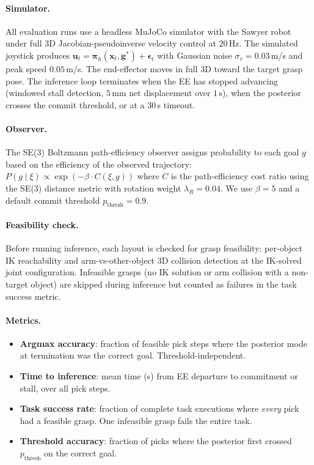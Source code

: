 \documentclass[letterpaper, 10pt, conference]{ieeeconf}
\begin{document}
\paragraph{Simulator.}
All evaluation runs use a headless MuJoCo simulator with the Sawyer
robot under full 3D Jacobian-pseudoinverse velocity control at
$20$\,Hz.  The simulated joystick produces $\mathbf{u}_t =
\boldsymbol{\pi}_h(\mathbf{x}_t, \mathbf{g}^*) +
\boldsymbol{\epsilon}_t$ with Gaussian noise $\sigma_v {=} 0.03$\,m/s
and peak speed $0.05$\,m/s.  The end-effector moves in full 3D
toward the target grasp pose.  The inference loop terminates when
the EE has stopped advancing (windowed stall detection, $5$\,mm net
displacement over $1$\,s), when the posterior crosses the commit
threshold, or at a $30$\,s timeout.

\paragraph{Observer.}
The SE(3) Boltzmann path-efficiency observer assigns probability to
each goal $g$ based on the efficiency of the observed trajectory:
$P(g \mid \xi) \propto \exp(-\beta \cdot C(\xi, g))$ where $C$ is
the path-efficiency cost ratio using the SE(3) distance metric with
rotation weight $\lambda_R {=} 0.04$.  We use $\beta {=} 5$ and a
default commit threshold $p_{\mathrm{thresh}} {=} 0.9$.

\paragraph{Feasibility check.}
Before running inference, each layout is checked for grasp
feasibility: per-object IK reachability and arm-vs-other-object
3D collision detection at the IK-solved joint configuration.
Infeasible grasps (no IK solution or arm collision with a
non-target object) are skipped during inference but counted as
failures in the task success metric.

\paragraph{Metrics.}
\begin{itemize}
  \item \textbf{Argmax accuracy}: fraction of feasible pick steps
    where the posterior mode at termination was the correct goal.
    Threshold-independent.
  \item \textbf{Time to inference}: mean time (s) from EE departure
    to commitment or stall, over all pick steps.
  \item \textbf{Task success rate}: fraction of complete task
    executions where \emph{every} pick had a feasible grasp.
    One infeasible grasp fails the entire task.
  \item \textbf{Threshold accuracy}: fraction of picks where the
    posterior first crossed $p_{\mathrm{thresh}}$ on the correct
    goal.
\end{itemize}
\end{document}

